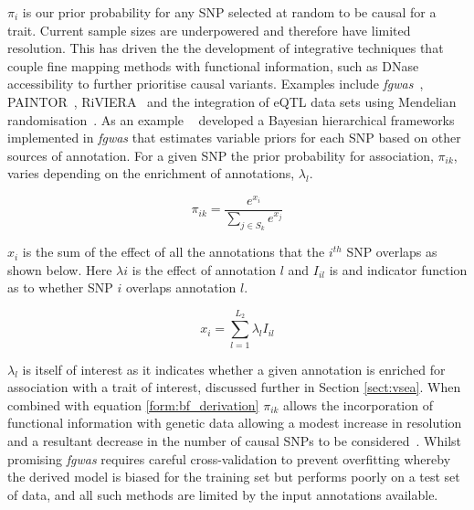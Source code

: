 \documentclass[a4paper,11pt]{report}
\begin{document}
$\pi_{i}$ is our prior probability for any SNP selected at random to be causal for a trait. Current sample sizes are underpowered and therefore have limited resolution. This has driven the the development of integrative techniques that couple fine mapping methods with functional information, such as DNase accessibility to further prioritise causal variants. Examples include \textit{fgwas}~\citep{Pickrell2014-xs}, PAINTOR~\citep{KichaevYangLindstromEtAl2014}, RiVIERA~\citep{LiKellis2016}   and the integration of eQTL data sets using Mendelian randomisation~\citep{ZhuZhangHuEtAl2016}. As an example ~\citet{Pickrell2014-xs} developed a Bayesian hierarchical frameworks implemented in \textit{fgwas} that estimates variable priors for each SNP based on other sources of annotation. For a given SNP the prior probability for association, $\pi_{ik}$, varies depending on the enrichment of annotations, $\lambda_{l}$. 

\begin{equation}
	\pi_{ik} = \frac{e^{x_{i}}}{\sum_{j \in S_k}e^{x_{j}}}
	\label{eqn:fgwas_var_prior}
\end{equation}

$x_i$ is the sum of the effect of all the annotations that the $i^{th}$ SNP overlaps as shown below.  Here $\lambda{i}$ is the effect of annotation $l$ and $I_{il}$ is and indicator function as to whether SNP $i$ overlaps annotation $l$.  

\begin{equation}
	x_{i} = \sum_{l=1}^{L_{2}} \lambda_{l}I_{il}
	\label{eqn:fgwas_lambda}
\end{equation}

$\lambda_{l}$ is itself of interest as it indicates whether a given annotation is enriched for association with a trait of interest, discussed further in Section \ref{sect:vsea}. When combined with equation \ref{form:bf_derivation} $\pi_{ik}$ allows the incorporation of functional information with genetic data allowing a modest increase in resolution and a resultant decrease in the number of causal SNPs to be considered~\citep{Pickrell2014-xs}. Whilst promising \textit{fgwas} requires careful cross-validation to prevent overfitting whereby the derived model is biased for the training set but performs poorly on a test set of data, and all such methods are limited by the input annotations available.
\end{document}
